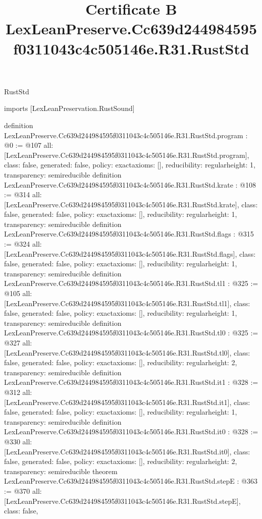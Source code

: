 \begin{lexlean}{RustStd}
\title{Certificate B LexLeanPreserve.Cc639d244984595f0311043c4c505146e.R31.RustStd}
\begin{coremodule}
imports [LexLeanPreservation.RustSound]

definition LexLeanPreserve.Cc639d244984595f0311043c4c505146e.R31.RustStd.program : @0 := @107 {
  all: [LexLeanPreserve.Cc639d244984595f0311043c4c505146e.R31.RustStd.program],
  class: false,
  generated: false,
  policy: exact{axioms: []},
  reducibility: regular{height: 1},
  transparency: semireducible
}
definition LexLeanPreserve.Cc639d244984595f0311043c4c505146e.R31.RustStd.krate : @108 := @314 {
  all: [LexLeanPreserve.Cc639d244984595f0311043c4c505146e.R31.RustStd.krate],
  class: false,
  generated: false,
  policy: exact{axioms: []},
  reducibility: regular{height: 1},
  transparency: semireducible
}
definition LexLeanPreserve.Cc639d244984595f0311043c4c505146e.R31.RustStd.flags : @315 := @324 {
  all: [LexLeanPreserve.Cc639d244984595f0311043c4c505146e.R31.RustStd.flags],
  class: false,
  generated: false,
  policy: exact{axioms: []},
  reducibility: regular{height: 1},
  transparency: semireducible
}
definition LexLeanPreserve.Cc639d244984595f0311043c4c505146e.R31.RustStd.tl1 : @325 := @105 {
  all: [LexLeanPreserve.Cc639d244984595f0311043c4c505146e.R31.RustStd.tl1],
  class: false,
  generated: false,
  policy: exact{axioms: []},
  reducibility: regular{height: 1},
  transparency: semireducible
}
definition LexLeanPreserve.Cc639d244984595f0311043c4c505146e.R31.RustStd.tl0 : @325 := @327 {
  all: [LexLeanPreserve.Cc639d244984595f0311043c4c505146e.R31.RustStd.tl0],
  class: false,
  generated: false,
  policy: exact{axioms: []},
  reducibility: regular{height: 2},
  transparency: semireducible
}
definition LexLeanPreserve.Cc639d244984595f0311043c4c505146e.R31.RustStd.it1 : @328 := @312 {
  all: [LexLeanPreserve.Cc639d244984595f0311043c4c505146e.R31.RustStd.it1],
  class: false,
  generated: false,
  policy: exact{axioms: []},
  reducibility: regular{height: 1},
  transparency: semireducible
}
definition LexLeanPreserve.Cc639d244984595f0311043c4c505146e.R31.RustStd.it0 : @328 := @330 {
  all: [LexLeanPreserve.Cc639d244984595f0311043c4c505146e.R31.RustStd.it0],
  class: false,
  generated: false,
  policy: exact{axioms: []},
  reducibility: regular{height: 2},
  transparency: semireducible
}
theorem LexLeanPreserve.Cc639d244984595f0311043c4c505146e.R31.RustStd.stepE : @363 := @370 {
  all: [LexLeanPreserve.Cc639d244984595f0311043c4c505146e.R31.RustStd.stepE],
  class: false,
}
\end{coremodule}
\end{lexlean}
